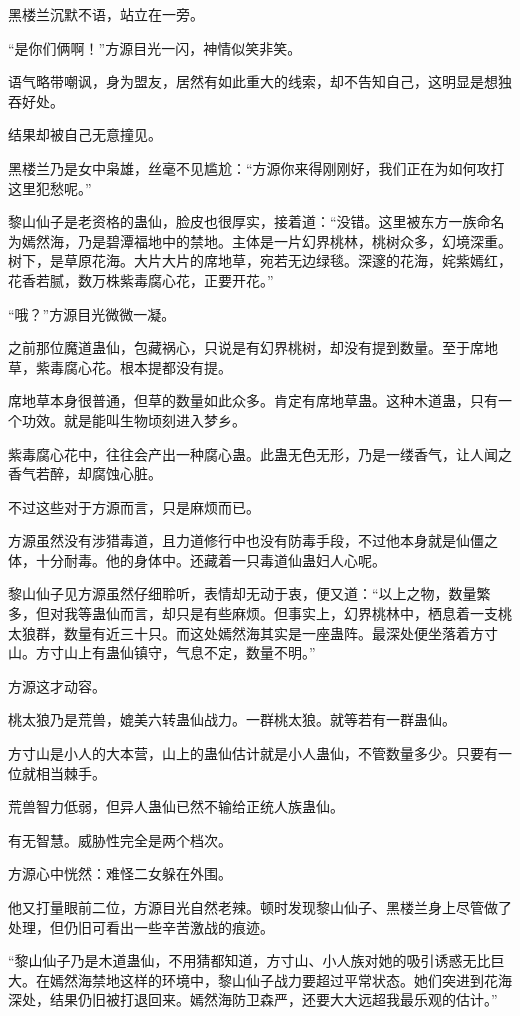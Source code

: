 \begin{this_body}
黑楼兰沉默不语，站立在一旁。

“是你们俩啊！”方源目光一闪，神情似笑非笑。

语气略带嘲讽，身为盟友，居然有如此重大的线索，却不告知自己，这明显是想独吞好处。

结果却被自己无意撞见。

黑楼兰乃是女中枭雄，丝毫不见尴尬：“方源你来得刚刚好，我们正在为如何攻打这里犯愁呢。”

黎山仙子是老资格的蛊仙，脸皮也很厚实，接着道：“没错。这里被东方一族命名为嫣然海，乃是碧潭福地中的禁地。主体是一片幻界桃林，桃树众多，幻境深重。树下，是草原花海。大片大片的席地草，宛若无边绿毯。深邃的花海，姹紫嫣红，花香若腻，数万株紫毒腐心花，正要开花。”

“哦？”方源目光微微一凝。

之前那位魔道蛊仙，包藏祸心，只说是有幻界桃树，却没有提到数量。至于席地草，紫毒腐心花。根本提都没有提。

席地草本身很普通，但草的数量如此众多。肯定有席地草蛊。这种木道蛊，只有一个功效。就是能叫生物顷刻进入梦乡。

紫毒腐心花中，往往会产出一种腐心蛊。此蛊无色无形，乃是一缕香气，让人闻之香气若醉，却腐蚀心脏。

不过这些对于方源而言，只是麻烦而已。

方源虽然没有涉猎毒道，且力道修行中也没有防毒手段，不过他本身就是仙僵之体，十分耐毒。他的身体中。还藏着一只毒道仙蛊妇人心呢。

黎山仙子见方源虽然仔细聆听，表情却无动于衷，便又道：“以上之物，数量繁多，但对我等蛊仙而言，却只是有些麻烦。但事实上，幻界桃林中，栖息着一支桃太狼群，数量有近三十只。而这处嫣然海其实是一座蛊阵。最深处便坐落着方寸山。方寸山上有蛊仙镇守，气息不定，数量不明。”

方源这才动容。

桃太狼乃是荒兽，媲美六转蛊仙战力。一群桃太狼。就等若有一群蛊仙。

方寸山是小人的大本营，山上的蛊仙估计就是小人蛊仙，不管数量多少。只要有一位就相当棘手。

荒兽智力低弱，但异人蛊仙已然不输给正统人族蛊仙。

有无智慧。威胁性完全是两个档次。

方源心中恍然：难怪二女躲在外围。

他又打量眼前二位，方源目光自然老辣。顿时发现黎山仙子、黑楼兰身上尽管做了处理，但仍旧可看出一些辛苦激战的痕迹。

“黎山仙子乃是木道蛊仙，不用猜都知道，方寸山、小人族对她的吸引诱惑无比巨大。在嫣然海禁地这样的环境中，黎山仙子战力要超过平常状态。她们突进到花海深处，结果仍旧被打退回来。嫣然海防卫森严，还要大大远超我最乐观的估计。”


\end{this_body}
